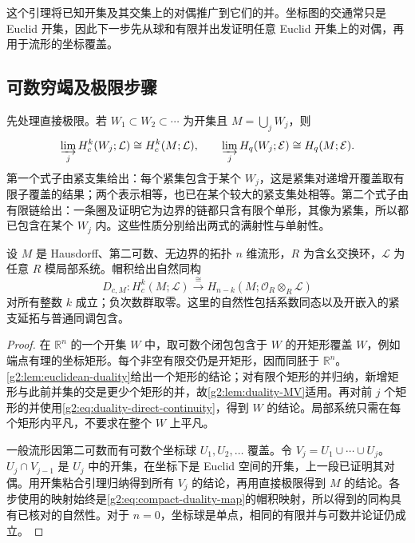 这个引理将已知开集及其交集上的对偶推广到它们的并。坐标图的交通常只是 Euclid 开集，因此下一步先从球和有限并出发证明任意 Euclid 开集上的对偶，再用于流形的坐标覆盖。

\subsection{可数穷竭及极限步骤}
\label{g2:subsec:0603:03}
先处理直接极限。若 \(W_1\subset W_2\subset\cdots\) 为开集且 \(M=\bigcup_jW_j\)，则
\begin{equation}\label{g2:eq:duality-direct-continuity}
	\varinjlim_jH_c^k(W_j;\mathcal L)\cong H_c^k(M;\mathcal L),\qquad
	\varinjlim_jH_q(W_j;\mathcal E)\cong H_q(M;\mathcal E).
\end{equation}
第一个式子由紧支集给出：每个紧集包含于某个 \(W_j\)，这是紧集对递增开覆盖取有限子覆盖的结果；两个表示相等，也已在某个较大的紧支集处相等。第二个式子由有限链给出：一条圈及证明它为边界的链都只含有限个单形，其像为紧集，所以都已包含在某个 \(W_j\) 内。这些性质分别给出两式的满射性与单射性。

\begin{theorem}[紧支 Poincaré 对偶]\label{g2:thm:poincare-duality-compact}
	设 \(M\) 是 Hausdorff、第二可数、无边界的拓扑 \(n\) 维流形，\(R\) 为含幺交换环，\(\mathcal L\) 为任意 \(R\) 模局部系统。帽积给出自然同构
	\begin{equation}\label{g2:eq:poincare-compact}
		D_{c,M}:H_c^k(M;\mathcal L)\xrightarrow{\ \cong\ }H_{n-k}(M;\mathcal O_R\otimes_R\mathcal L)
	\end{equation}
	对所有整数 \(k\) 成立；负次数群取零。这里的自然性包括系数同态以及开嵌入的紧支延拓与普通同调包含。
\end{theorem}
\begin{proof}
	在 \(\mathbb R^n\) 的一个开集 \(W\) 中，取可数个闭包包含于 \(W\) 的开矩形覆盖 \(W\)，例如端点有理的坐标矩形。每个非空有限交仍是开矩形，因而同胚于 \(\mathbb R^n\)。\cref{g2:lem:euclidean-duality}给出一个矩形的结论；对有限个矩形的并归纳，新增矩形与此前并集的交是更少个矩形的并，故\cref{g2:lem:duality-MV}适用。再对前 \(j\) 个矩形的并使用\eqref{g2:eq:duality-direct-continuity}，得到 \(W\) 的结论。局部系统只需在每个矩形内平凡，不要求在整个 \(W\) 上平凡。

	一般流形因第二可数而有可数个坐标球 \(U_1,U_2,\ldots\) 覆盖。令 \(V_j=U_1\cup\cdots\cup U_j\)。\(U_j\cap V_{j-1}\) 是 \(U_j\) 中的开集，在坐标下是 Euclid 空间的开集，上一段已证明其对偶。用开集粘合引理归纳得到所有 \(V_j\) 的结论，再用直接极限得到 \(M\) 的结论。各步使用的映射始终是\eqref{g2:eq:compact-duality-map}的帽积映射，所以得到的同构具有已核对的自然性。对于 \(n=0\)，坐标球是单点，相同的有限并与可数并论证仍成立。
\end{proof}

